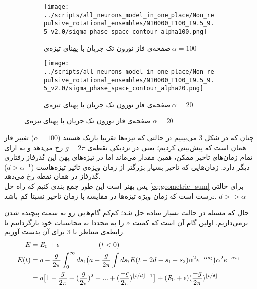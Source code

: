 \begin{figure}[h]
	\begin{subfigure}[b]{0.5\textwidth}
		\centering
		\texttt{[image: ../scripts/all\_neurons\_model\_in\_one\_place/Non\_repulsive\_rotational\_ensembles/N10000\_T100\_I9.5\_9.5\_v2.0/sigma\_phase\_space\_contour\_alpha100.png]}
		\caption{صفحه‌ی فاز نورون تک جریان با پهنای تیزه‌ی 
				$\alpha = 100$}
		\label{fig:non_repulsive_single_input_sigma_phase_space_alpha100}
	\end{subfigure}
	\hfill
	\begin{subfigure}[b]{0.5\textwidth}
		\centering
		\texttt{[image: ../scripts/all\_neurons\_model\_in\_one\_place/Non\_repulsive\_rotational\_ensembles/N10000\_T100\_I9.5\_9.5\_v2.0/sigma\_phase\_space\_contour\_alpha20.png]}
		\caption{صفحه‌ی فاز نورون تک جریان با پهنای تیزه‌ی 
		$\alpha = 20$}
		\label{fig:non_repulsive_single_input_sigma_phase_space_alpha20}
	\end{subfigure}
	\label{fig:non_repulsive_single_input_sigma_phase_space}
\end{figure}

چنان که در شکل \ref{fig:non_repulsive_single_input_sigma_phase_space} می‌بینیم در حالتی که تیزه‌ها تقریبا باریک هستند ($\alpha = 100$) تغییر فاز همان است که پیش‌بینی کردیم؛ یعنی در نزدیکی نقطه‌ی 
$g = 2\pi$
رخ می‌دهد و به ازای تمام زمان‌های تاخیر ممکن، همین مقدار می‌ماند اما در تیزه‌های پهن این گذرفاز رفتاری دیگر دارد. زمان‌هایی که تاخیر بسیار بزرگتر از زمان ویژه‌ی تاثیر تیزه‌هاست
($d > \alpha^{-1}$)
گذرفاز در همان نقطه رخ می‌دهد.\\

پس بهتر است این طور جمع بندی‌ کنیم که راه حل
\ref{eq:geometric_sum}
برای حالتی درست است که زمان ویژه تیزه‌ها در مقایسه با زمان تاخیر نسبتا کم باشد.
$d >> \alpha$

حال که مسئله در حالت بسیار ساده حل شد؛ کم‌کم گام‌هایی رو به سمت پیچیده شدن برمی‌داریم. اولین گام آن است که کمیت $\alpha$ را به مجددا به محاسبات خود بازگردانیم تا رابطه‌ی متناظر با
\ref{fig:non_repulsive_single_input_sigma_phase_space}
برای آن بدست آوریم.
\begin{align}
	E &= E_0 + \epsilon \hspace{2cm} (t<0) \\
	E(t) &= a - \frac{g}{2\pi} \int_{0}^{\infty} ds_1 \big( a - \frac{g}{2\pi} \int ds_2 E(t - 2d - s_1 - s_2) \alpha^2 e^{-\alpha s_2} \big) \alpha^2 e^{-\alpha s_1} \\
	&= a \big[ 1 - \frac{g}{2\pi} + (\frac{g}{2\pi})^2 + ... + (\frac{-g}{2\pi})^{\left\lfloor t/d \right\rfloor - 1} \big] + (E_0 + \epsilon) (\frac{-g}{2\pi})^{\left\lfloor t/d \right\rfloor}
\end{align}
